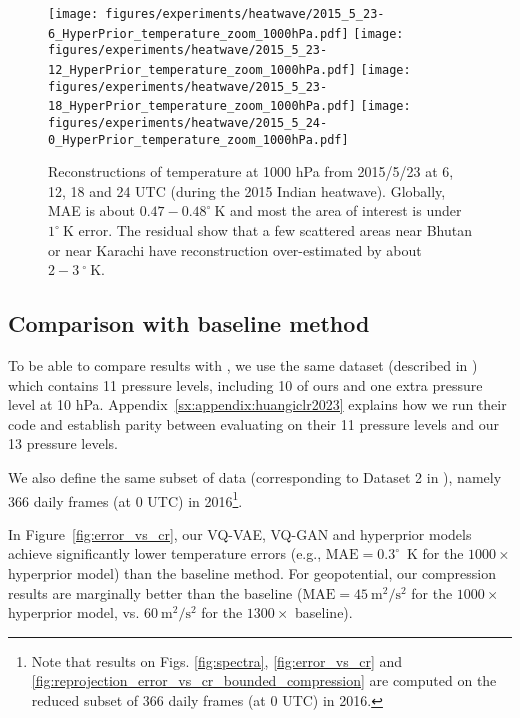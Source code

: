 \begin{figure}
    \centering
    \texttt{[image: figures/experiments/heatwave/2015\_5\_23-6\_HyperPrior\_temperature\_zoom\_1000hPa.pdf]}
    \texttt{[image: figures/experiments/heatwave/2015\_5\_23-12\_HyperPrior\_temperature\_zoom\_1000hPa.pdf]}
    \texttt{[image: figures/experiments/heatwave/2015\_5\_23-18\_HyperPrior\_temperature\_zoom\_1000hPa.pdf]}
    \texttt{[image: figures/experiments/heatwave/2015\_5\_24-0\_HyperPrior\_temperature\_zoom\_1000hPa.pdf]}
    \hfill
    \caption{Reconstructions of temperature at 1000 hPa from 2015/5/23 at 6, 12, 18 and 24 UTC (during the 2015 Indian heatwave). Globally, MAE is about $0.47-0.48^\circ~\text{K}$ and most the area of interest is under $1^\circ~\text{K}$ error. The residual show that a few scattered areas near Bhutan or near Karachi have reconstruction over-estimated by about $2-3~^\circ~\text{K}$.}
    \label{fig:heatwave}
\end{figure}

\subsection{Comparison with baseline method}

To be able to compare results with \cite{huang2022compressing}, we use the same dataset (described in \cite{ashkboos2022ens}) which contains 11 pressure levels, including 10 of ours and one extra pressure level at 10 hPa. Appendix~\ref{sx:appendix:huangiclr2023} explains how we run their code and establish parity between evaluating on their 11 pressure levels and our 13 pressure levels.

We also define the same subset of data (corresponding to Dataset 2 in \citet{huang2022compressing}), namely 366 daily frames (at 0 UTC) in 2016\footnote{Note that results on Figs. \ref{fig:spectra}, \ref{fig:error_vs_cr} and \ref{fig:reprojection_error_vs_cr_bounded_compression} are computed on the reduced subset of 366 daily frames (at 0 UTC) in 2016.}.

In Figure~\ref{fig:error_vs_cr}, our VQ-VAE, VQ-GAN and hyperprior models achieve significantly lower temperature errors (e.g., $\text{MAE}=0.3^\circ$~K for the $1000 \times$ hyperprior model) than the baseline method. For geopotential, our compression results are marginally better than the baseline ($\text{MAE}=45~\text{m}^2/\text{s}^2$ for the $1000 \times$ hyperprior model, vs. $60~\text{m}^2/\text{s}^2$ for the $1300 \times$ baseline).

